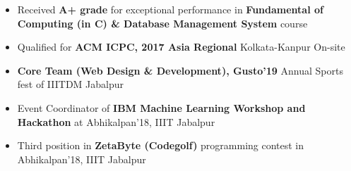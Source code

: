 
\begin{itemize}
	\item Received \textbf{A+ grade} for exceptional performance in \textbf {Fundamental of Computing (in C) \& Database Management System } course
	\item Qualified for \textbf{ACM ICPC, 2017 Asia Regional} Kolkata-Kanpur On-site
	\item \textbf{Core Team (Web Design \& Development), Gusto'19} Annual Sports fest of IIITDM Jabalpur
    \item Event Coordinator of \textbf{IBM Machine Learning Workshop and Hackathon} at Abhikalpan'18, IIIT Jabalpur
    \item Third position in \textbf{ZetaByte (Codegolf)} programming contest in Abhikalpan'18, IIIT Jabalpur
\end{itemize}
\medskip
